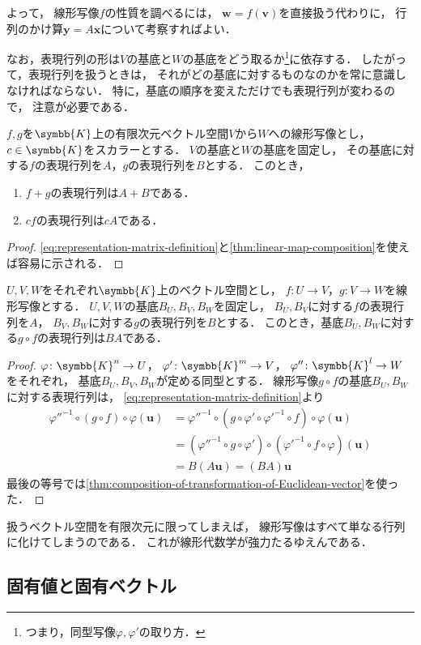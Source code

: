 \documentclass[../sotsu.tex]{subfiles}
\begin{document}
よって，
線形写像$f$の性質を調べるには，
$\symbf{w} = f(\symbf{v})$を直接扱う代わりに，
行列のかけ算$\symbf{y} = A \symbf{x}$について考察すればよい．

なお，表現行列の形は$V$の基底と$W$の基底をどう取るか\footnote{
    つまり，同型写像$\varphi, \varphi'$の取り方．
}に依存する．
したがって，表現行列を扱うときは，
それがどの基底に対するものなのかを常に意識しなければならない．
特に，基底の順序を変えただけでも表現行列が変わるので，
注意が必要である．

\begin{proposition}
    $f, g$を$\symbb{K}$上の有限次元ベクトル空間$V$から$W$への線形写像とし，
    $c \in \symbb{K}$をスカラーとする．
    $V$の基底と$W$の基底を固定し，
    その基底に対する$f$の表現行列を$A$，$g$の表現行列を$B$とする．
    このとき，
    \begin{enumerate}
        \item $f + g$の表現行列は$A + B$である．
        \item $cf$の表現行列は$cA$である．
    \end{enumerate}
\end{proposition}

\begin{proof}
    \cref{eq:representation-matrix-definition}と\cref{thm:linear-map-composition}を使えば容易に示される．
\end{proof}


\begin{theorem}
    $U, V, W$をそれぞれ$\symbb{K}$上のベクトル空間とし，
    $f \colon U \to V$，$g \colon V \to W$を線形写像とする．
    $U, V, W$の基底$B_U, B_V, B_W$を固定し，
    $B_U, B_V$に対する$f$の表現行列を$A$，
    $B_V, B_W$に対する$g$の表現行列を$B$とする．
    このとき，基底$B_U, B_W$に対する$g \circ f$の表現行列は$BA$である．
\end{theorem}

\begin{proof}
    $\varphi   \colon \symbb{K}^n \to U$，
    $\varphi'  \colon \symbb{K}^m \to V$，
    $\varphi'' \colon \symbb{K}^l \to W$をそれぞれ，
    基底$B_U, B_V, B_W$が定める同型とする．
    線形写像$g \circ f$の基底$B_U, B_W$に対する表現行列は，
    \cref{eq:representation-matrix-definition}より
    \begin{equation*}
        \begin{split}
            \varphi''^{-1} \circ (g \circ f) \circ \varphi (\symbf{u})
            &= \varphi''^{-1} \circ (g \circ \varphi' \circ \varphi'^{-1} \circ f) \circ \varphi (\symbf{u})
            \\
            &= (\varphi''^{-1} \circ g \circ \varphi') \circ (\varphi'^{-1} \circ f \circ \varphi) (\symbf{u})
            \\
            &= B (A \symbf{u})
            = (BA)\symbf{u}
        \end{split}
    \end{equation*}
    最後の等号では\cref{thm:composition-of-transformation-of-Euclidean-vector}を使った．
\end{proof}


扱うベクトル空間を有限次元に限ってしまえば，
線形写像はすべて単なる行列に化けてしまうのである．
これが線形代数学が強力たるゆえんである．



\subsection{固有値と固有ベクトル}
\label{sec:eigenvalue-and-eigenvector}
\end{document}
